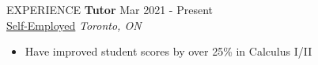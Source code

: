 \documentclass{resume}
\begin{document}
\begin{rSection}{EXPERIENCE}
\textbf{Tutor} \hfill Mar 2021 - Present \\
\href{https://www.overleaf.com/read/qybvrsfbsbwq}{Self-Employed} \hfill \textit{Toronto, ON} 
\vspace{-0.2cm}
\begin{itemize}
   \itemsep -8pt {} 
   \item  Have improved student scores by over 25\% in Calculus I/II
\end{itemize}
\end{rSection} 

\end{document}
